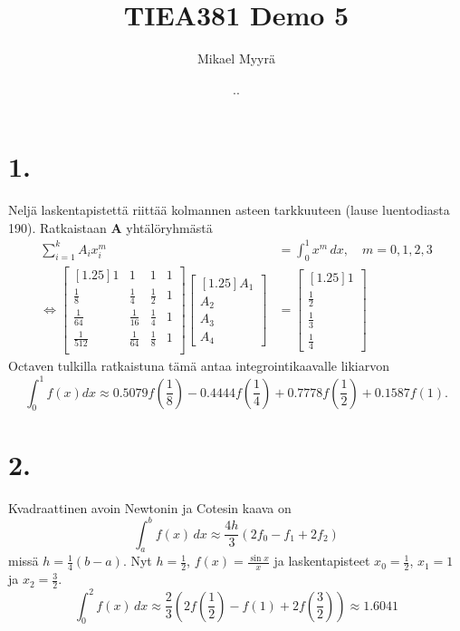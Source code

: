 \documentclass{article}
\title{TIEA381 Demo 5}
\author{Mikael Myyrä}
\date{\number\day.\number\month.\number\year}
\begin{document}
\maketitle

\section*{1.}

Neljä laskentapistettä riittää kolmannen asteen tarkkuuteen (lause luentodiasta 190).
Ratkaistaan $\mathbf{A}$ yhtälöryhmästä
\begin{align*}
  \sum_{i=1}^k A_ix_i^m &= \int_0^1 x^m\,dx, \quad m = 0,1,2,3 \\
  \iff \begin{bmatrix}[1.25]
    1 & 1 & 1 & 1 \\
    \frac{1}{8} & \frac{1}{4} & \frac{1}{2} & 1 \\
    \frac{1}{64} & \frac{1}{16} & \frac{1}{4} & 1 \\
    \frac{1}{512} & \frac{1}{64} & \frac{1}{8} & 1 \\
  \end{bmatrix}
  \begin{bmatrix}[1.25]
    A_1 \\ A_2 \\ A_3 \\ A_4
  \end{bmatrix}
                        &=
  \begin{bmatrix}[1.25]
    1 \\ \frac{1}{2} \\ \frac{1}{3} \\ \frac{1}{4}
  \end{bmatrix}
\end{align*}
Octaven tulkilla ratkaistuna tämä antaa integrointikaavalle likiarvon
\[
  \int_0^1 f(x)dx
    \approx 0.5079f(\frac{1}{8})
    - 0.4444f(\frac{1}{4})
    + 0.7778f(\frac{1}{2})
    + 0.1587f(1).
\]


\section*{2.}

Kvadraattinen avoin Newtonin ja Cotesin kaava on
\[
  \int_a^b f(x)\,dx \approx \frac{4h}{3}(2f_0 - f_1 + 2f_2)
\]
missä $h = \frac{1}{4}(b - a)$.
Nyt $h = \frac{1}{2}$, $f(x) = \frac{\sin x}{x}$
ja laskentapisteet $x_0 = \frac{1}{2}$, $x_1 = 1$ ja $x_2 = \frac{3}{2}$.
\[
  \int_0^2 f(x)\,dx \approx \frac{2}{3}(2f(\frac{1}{2}) - f(1) + 2f(\frac{3}{2}))
    \approx 1.6041
\]
\end{document}
